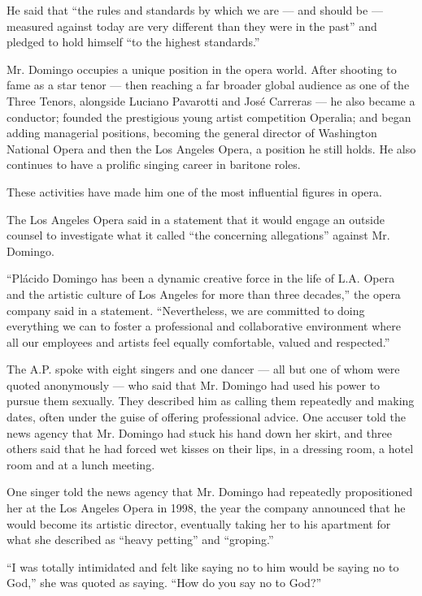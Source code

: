 He said that ``the rules and standards by which we are --- and should be
--- measured against today are very different than they were in the
past'' and pledged to hold himself ``to the highest standards.''

Mr. Domingo occupies a unique position in the opera world. After
shooting to fame as a star tenor --- then reaching a far broader global
audience as one of the Three Tenors, alongside Luciano Pavarotti and
José Carreras --- he also became a conductor; founded the prestigious
young artist competition Operalia; and began adding managerial
positions, becoming the general director of Washington National Opera
and then the Los Angeles Opera, a position he still holds. He also
continues to have a prolific singing career in baritone roles.

These activities have made him one of the most influential figures in
opera.

The Los Angeles Opera said in a statement that it would engage an
outside counsel to investigate what it called ``the concerning
allegations'' against Mr. Domingo.

``Plácido Domingo has been a dynamic creative force in the life of L.A.
Opera and the artistic culture of Los Angeles for more than three
decades,'' the opera company said in a statement. ``Nevertheless, we are
committed to doing everything we can to foster a professional and
collaborative environment where all our employees and artists feel
equally comfortable, valued and respected.''

The A.P. spoke with eight singers and one dancer --- all but one of whom
were quoted anonymously --- who said that Mr. Domingo had used his power
to pursue them sexually. They described him as calling them repeatedly
and making dates, often under the guise of offering professional advice.
One accuser told the news agency that Mr. Domingo had stuck his hand
down her skirt, and three others said that he had forced wet kisses on
their lips, in a dressing room, a hotel room and at a lunch meeting.

One singer told the news agency that Mr. Domingo had repeatedly
propositioned her at the Los Angeles Opera in 1998, the year the company
announced that he would become its artistic director, eventually taking
her to his apartment for what she described as ``heavy petting'' and
``groping.''

``I was totally intimidated and felt like saying no to him would be
saying no to God,'' she was quoted as saying. ``How do you say no to
God?''

